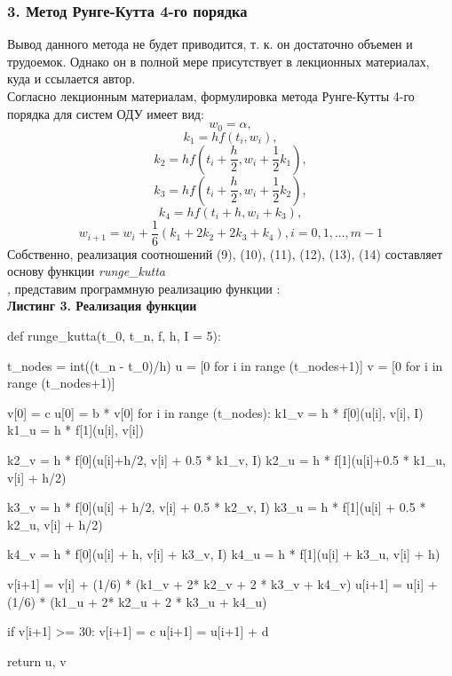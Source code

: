 \subsubsection{3. Метод Рунге-Кутта 4-го порядка}
\hspace*{\parindent}Вывод данного метода не будет приводится, т. к. он достаточно объемен и трудоемок. Однако он в полной мере присутствует в лекционных материалах, куда и ссылается автор. \\
\indent Согласно лекционным материалам, формулировка метода Рунге-Кутты 4-го порядка для систем ОДУ имеет вид:
\begin{equation}
    w_0 = \alpha, 
\end{equation}
\begin{equation}
    k_1 = hf(t_i, w_i), 
\end{equation}
\begin{equation}
    k_2 = hf(t_i+\frac{h}{2}, w_i + \frac{1}{2}k_1),
\end{equation}
\begin{equation}
    k_3 = hf(t_i+\frac{h}{2}, w_i + \frac{1}{2}k_2),
\end{equation}
\begin{equation}
    k_4 = hf(t_i+h, w_i + k_3),
\end{equation}
\begin{equation}
    w_{i+1} = w_i + \frac16(k_1+2k_2+2k_3+k_4), i = 0, 1, ..., m-1
\end{equation}
Собственно, реализация соотношений (9), (10), (11), (12), (13), (14) составляет основу функции \textit{runge_kutta}
\\
, представим программную реализацию функции :\\
\textbf{Листинг 3. Реализация функции }
\hypertarget{lst3}{}
\begin{python}
def runge_kutta(t_0, t_n, f, h, I = 5):

    t_nodes = int((t_n - t_0)/h)
    u = [0 for i in range (t_nodes+1)]
    v = [0 for i in range (t_nodes+1)]

    v[0] = c
    u[0] = b * v[0]
    for i in range (t_nodes):
      k1_v = h * f[0](u[i], v[i], I)
      k1_u = h * f[1](u[i], v[i])

      k2_v = h * f[0](u[i]+h/2, v[i] + 0.5 * k1_v, I)
      k2_u = h * f[1](u[i]+0.5 * k1_u, v[i] + h/2)

      k3_v = h * f[0](u[i] + h/2, v[i] + 0.5 * k2_v, I)
      k3_u = h * f[1](u[i] + 0.5 * k2_u, v[i] + h/2)

      k4_v = h * f[0](u[i] + h, v[i] + k3_v, I)
      k4_u = h * f[1](u[i] + k3_u, v[i] + h)

      v[i+1] = v[i] + (1/6) * (k1_v + 2* k2_v + 2 * k3_v + k4_v)
      u[i+1] = u[i] + (1/6) * (k1_u + 2* k2_u + 2 * k3_u + k4_u)

      if v[i+1] >= 30:
        v[i+1] = c
        u[i+1] = u[i+1] + d  
  
    return u, v 
\end{python}
\clearpage
